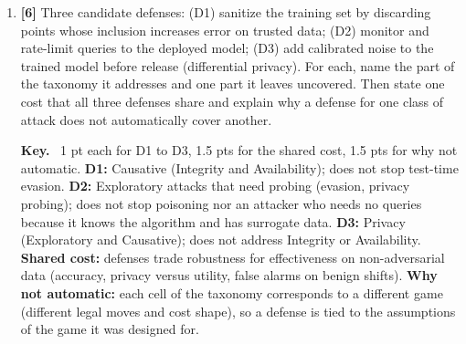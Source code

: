 \documentclass[10pt,a4paper]{extarticle}
\newcommand{\pts}[1]{\textbf{\color{accent}[#1]}\enspace}
\newenvironment{sol}{\par\smallskip
    \begin{tcolorbox}[colback=accent!6, colframe=accent, boxrule=0.5pt, arc=1pt,
                      left=5pt, right=5pt, top=2pt, bottom=2pt, breakable, fontupper=\small]
    \textbf{\color{accent}Key.}\ }{\end{tcolorbox}\par}
\begin{document}
\begin{enumerate}[label=(\alph*)]
\begin{sol}
(i) Exploratory, Integrity (1 pt). (ii) It depends on the objective: targeted if only this one sample must pass, indiscriminate if the aim is a transformation that lets a whole class of malware evade; each axis is really a spectrum and the analyst must decide from the attacker's goal (2 pts). (iii) The probes enter the training data, so the attacker acquires an \(A^{(train)}\) move in addition to \(A^{(eval)}\) and the attack becomes Causative as well; the defender must then consider poisoning (for instance, sanitize submitted samples), since the influence axis determines the legal moves in the game (3 pts).
\end{sol}

\item \pts{6} Three candidate defenses: (D1) sanitize the training set by discarding points whose inclusion increases error on trusted data; (D2) monitor and rate-limit queries to the deployed model; (D3) add calibrated noise to the trained model before release (differential privacy). For each, name the part of the taxonomy it addresses and one part it leaves uncovered. Then state one cost that all three defenses share and explain why a defense for one class of attack does not automatically cover another.

\begin{sol}
1 pt each for D1 to D3, 1.5 pts for the shared cost, 1.5 pts for why not automatic. \textbf{D1:} Causative (Integrity and Availability); does not stop test-time evasion. \textbf{D2:} Exploratory attacks that need probing (evasion, privacy probing); does not stop poisoning nor an attacker who needs no queries because it knows the algorithm and has surrogate data. \textbf{D3:} Privacy (Exploratory and Causative); does not address Integrity or Availability. \textbf{Shared cost:} defenses trade robustness for effectiveness on non-adversarial data (accuracy, privacy versus utility, false alarms on benign shifts). \textbf{Why not automatic:} each cell of the taxonomy corresponds to a different game (different legal moves and cost shape), so a defense is tied to the assumptions of the game it was designed for.
\end{sol}
\end{enumerate}
\end{document}
